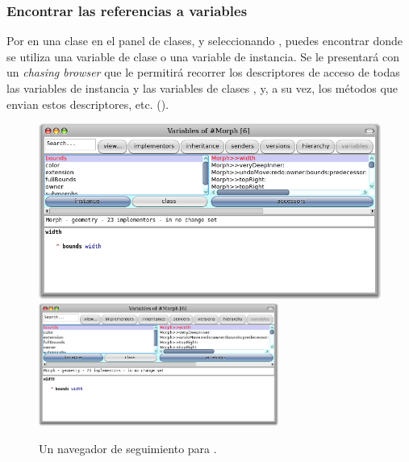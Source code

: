 \documentclass[spanish,a4paper,10pt,twoside]{book}
\begin{document}
\subsubsection{Encontrar las referencias a variables}

Por  en una clase en el panel de clases, y seleccionando , puedes encontrar donde se utiliza una variable de clase o una variable de instancia.
Se le presentar\'a con un \emph{chasing browser} que le permitir\'a recorrer los descriptores de acceso de todas las variables de instancia y las variables de clases , y, a su vez, los m\'etodos que envian estos descriptores, etc. ().

\begin{figure}[btp]
	\begin{center}
	\ifluluelse
		{\includegraphics[width=\textwidth]{chasingBrowser}}
		{\includegraphics[width=0.7\textwidth]{chasingBrowser}}
	\end{center}
	\caption{Un navegador de seguimiento para .}
\end{figure}

\end{document}
